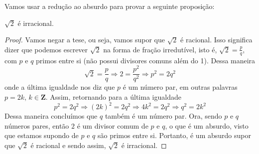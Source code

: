 Vamos usar a redução ao absurdo para provar a seguinte proposição:
\begin{prop}
$\sqrt{2}$ é irracional.
\end{prop}
\begin{proof}
Vamos negar a tese, ou seja, vamos supor que $\sqrt{2}$ é racional. Isso significa dizer que podemos escrever $\sqrt{2}$ na forma de fração irredutível, isto é, $\sqrt{2}=\frac{p}{q}$, com $p$ e $q$ primos entre si (não possui divisores comuns além do 1). Dessa maneira
$$\sqrt{2}=\frac{p}{q} \Rightarrow 2=\frac{p^2}{q^2} \Rightarrow p^2=2q^2$$
onde a última igualdade nos diz que $p$ é um número par, em outras palavras $p=2k$, $k \in \mathbf{Z}$. Assim, retornando para a última igualdade
$$p^2=2q^2 \Rightarrow (2k)^2=2q^2 \Rightarrow 4k^2=2q^2 \Rightarrow q^2=2k^2$$
Dessa maneira concluímos que $q$ também é um número par. Ora, sendo $p$ e $q$ números pares, então $2$ é um divisor comum de $p$ e $q$, o que é um absurdo, visto que estamos supondo de $p$ e $q$ são primos entre si. Portanto, é um absurdo supor que $\sqrt{2}$ é racional e sendo assim, $\sqrt{2}$ é irracional.
\end{proof}
